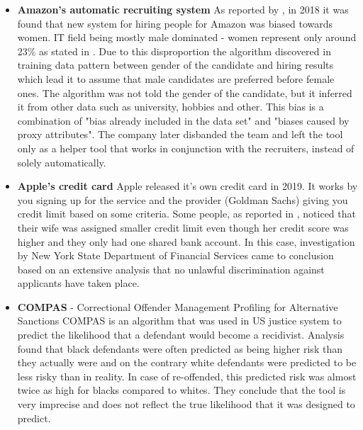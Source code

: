
\begin{itemize}
    \item \textbf{Amazon's automatic recruiting system}\newline
    As reported by \cite{amazon-unfair-hiring-2018}, in 2018 it was found that new system for hiring people for Amazon was biased towards women. IT field being mostly male dominated - women represent only around 23\% as stated in \cite{women-in-tech-2021}. Due to this disproportion the algorithm discovered in training data pattern between gender of the candidate and hiring results which lead it to assume that male candidates are preferred before female ones. The algorithm was not told the gender of the candidate, but it inferred it from other data such as university, hobbies and other. This bias is a combination of "bias already included in the data set" and "biases caused by proxy attributes". The company later disbanded the team and left the tool only as a helper tool that works in conjunction with the recruiters, instead of solely automatically.
    
    \item \textbf{Apple's credit card}\newline
    Apple released it's own credit card in 2019. It works by you signing up for the service and the provider (Goldman Sachs) giving you credit limit based on some criteria. Some people, as reported in \cite{apple-card-washingtonpost-2019}, noticed that their wife was assigned smaller credit limit even though her credit score was higher and they only had one shared bank account.
    In this case, investigation by New York State Department of Financial Services came to conclusion based on an extensive analysis that no unlawful discrimination against applicants have taken place.
    
    \item \textbf{COMPAS} - Correctional Offender Management Profiling for Alternative Sanctions\newline
    COMPAS is an algorithm that was used in US justice system to predict the likelihood that a defendant would become a recidivist. Analysis \cite{compas-analysis-2020} found that black defendants were often predicted as being higher risk than they actually were and on the contrary white defendants were predicted to be less risky than in reality. In case of re-offended, this predicted risk was almost twice as high for blacks compared to whites. They conclude that the tool is very imprecise and does not reflect the true likelihood that it was designed to predict.
\end{itemize}

